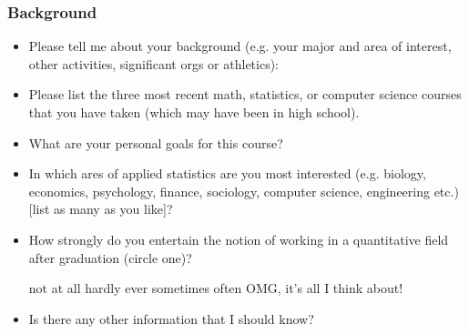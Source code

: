 \documentclass[10pt]{article}
\begin{document}
\subsubsection*{Background}
\begin{itemize}
	\itemsep1.5cm
	\item Please tell me about your background (e.g. your major and area of interest, other activities, significant orgs or athletics):
	\item Please list the three most recent math, statistics, or computer science courses that you have taken (which may have been in high school). 
	\item What are your personal goals for this course?
	\item In which ares of applied statistics are you most interested (e.g. biology, economics, psychology, finance, sociology, computer science, engineering etc.) [list as many as you like]?
	\item How strongly do you entertain the notion of working in a quantitative field after graduation (circle one)?
	\begin{center}
		not at all \qquad hardly ever \qquad sometimes \qquad often \qquad OMG, it's all I think about!
	\end{center}
	\item Is there any other information that I should know?
\end{itemize}
\end{document}
